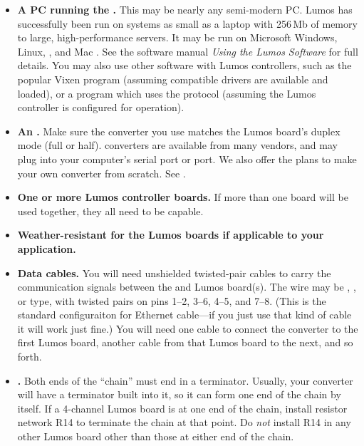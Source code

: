 \documentclass[letterpaper,twoside,onecolumn,openright,final]{memoir}
\begin{document}
\begin{itemize}
	\item	{\bfseries A PC running the .}
		This may be nearly any semi-modern PC.  Lumos has successfully been run on systems as small as 
		a laptop with 256\,Mb of memory to large, high-performance servers.  It may be run on Microsoft
		Windows, Linux, , and Mac .  See the software manual \emph{Using the Lumos Software} 
		for full details.  You may also use other software with Lumos controllers, such as the popular
		Vixen program (assuming compatible drivers are available and loaded), or a program which uses the
		 protocol (assuming the Lumos controller is configured for  operation).
		
	\item	{\bfseries An .}
		Make sure the  converter you use matches the Lumos board's duplex mode (full or half).  
		converters are available from many vendors, and may plug into your computer's serial port or 
		port.  We also offer the plans to make your own  converter from scratch.
		See .

	\item	{\bfseries One or more Lumos controller boards.}  If more than one board will be used together,
		they all need to be  capable.  

	\item	{\bfseries Weather-resistant  for the Lumos boards if applicable to your application.}

	\item	{\bfseries Data cables.}  You will need unshielded twisted-pair cables to carry the communication signals
		between the  and Lumos board(s).
		The
		wire may be , , or  type, 
		with twisted pairs on pins 1--2, 3--6, 4--5, and 7--8.
		(This is the standard configuraiton for Ethernet cable---if you just use that kind of cable
		it will work just fine.)  You will need one cable to connect the  converter to the
		first Lumos board, another cable from that Lumos board to the next, and so forth.  

	\item	{\bfseries {} .}  
		Both ends of the  ``chain'' must end in a terminator.
		Usually, your  converter will have a terminator built into it, so it can form one end of the chain
		by itself.  If a 4-channel Lumos board is at one end of the chain, install resistor network R14 to terminate the
		chain at that point.  Do \emph{not} install R14 in any other Lumos board other than those at either end of
		the chain.


\end{itemize}
\end{document}
